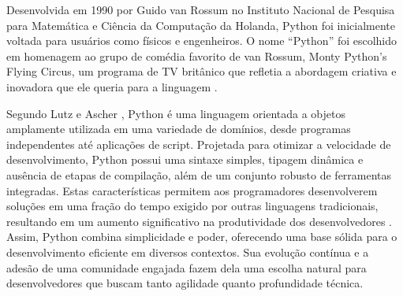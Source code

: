 Desenvolvida em 1990 por Guido van Rossum no Instituto Nacional de Pesquisa para Matemática e Ciência da Computação da Holanda, Python foi inicialmente voltada para usuários como físicos e engenheiros. O nome ``Python'' foi escolhido em homenagem ao grupo de comédia favorito de van Rossum, Monty Python's Flying Circus, um programa de TV britânico que refletia a abordagem criativa e inovadora que ele queria para a linguagem \cite{meireles2010}.

Segundo Lutz e Ascher \cite{lutz2007}, Python é uma linguagem orientada a objetos amplamente utilizada em uma variedade de domínios, desde programas independentes até aplicações de script. Projetada para otimizar a velocidade de desenvolvimento, Python possui uma sintaxe simples, tipagem dinâmica e ausência de etapas de compilação, além de um conjunto robusto de ferramentas integradas. Estas características permitem aos programadores desenvolverem soluções em uma fração do tempo exigido por outras linguagens tradicionais, resultando em um aumento significativo na produtividade dos desenvolvedores \cite{lutz2007}. Assim, Python combina simplicidade e poder, oferecendo uma base sólida para o desenvolvimento eficiente em diversos contextos. Sua evolução contínua e a adesão de uma comunidade engajada fazem dela uma escolha natural para desenvolvedores que buscam tanto agilidade quanto profundidade técnica.


